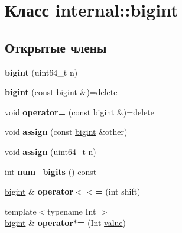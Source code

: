 \hypertarget{classinternal_1_1bigint}{}\section{Класс internal\+:\+:bigint}
\label{classinternal_1_1bigint}
\subsection*{Открытые члены}
\begin{DoxyCompactItemize}
\item 
\mbox{\label{classinternal_1_1bigint_a566e6d0aacfa189f66ca278cfd4d4bd5}} 
{\bfseries bigint} (uint64\+\_\+t n)
\item 
\mbox{\label{classinternal_1_1bigint_adc7a5b36110fa161e61ce3e1557ef3fa}} 
{\bfseries bigint} (const \hyperlink{classinternal_1_1bigint}{bigint} \&)=delete
\item 
\mbox{\label{classinternal_1_1bigint_abb39600be766ee3026e34d237a0403ab}} 
void {\bfseries operator=} (const \hyperlink{classinternal_1_1bigint}{bigint} \&)=delete
\item 
\mbox{\label{classinternal_1_1bigint_a6727bdbb59a30b3e1afc2c9e5d5bd1ab}} 
void {\bfseries assign} (const \hyperlink{classinternal_1_1bigint}{bigint} \&other)
\item 
\mbox{\label{classinternal_1_1bigint_a82a5de200ec5e73d4b29be400828b75f}} 
void {\bfseries assign} (uint64\+\_\+t n)
\item 
\mbox{\label{classinternal_1_1bigint_ad299cb4e6a4b1e3ef89fa18f2896fc77}} 
int {\bfseries num\+\_\+bigits} () const
\item 
\mbox{\label{classinternal_1_1bigint_ac739e1c553c5525334727a5a548188b9}} 
\hyperlink{classinternal_1_1bigint}{bigint} \& {\bfseries operator$<$$<$=} (int shift)
\item 
\mbox{\label{classinternal_1_1bigint_a6400e0b29d337a3c031a4124553285ee}} 
{\footnotesize template$<$typename Int $>$ }\\\hyperlink{classinternal_1_1bigint}{bigint} \& {\bfseries operator$\ast$=} (Int \hyperlink{classinternal_1_1value}{value})

\end{DoxyCompactItemize}
